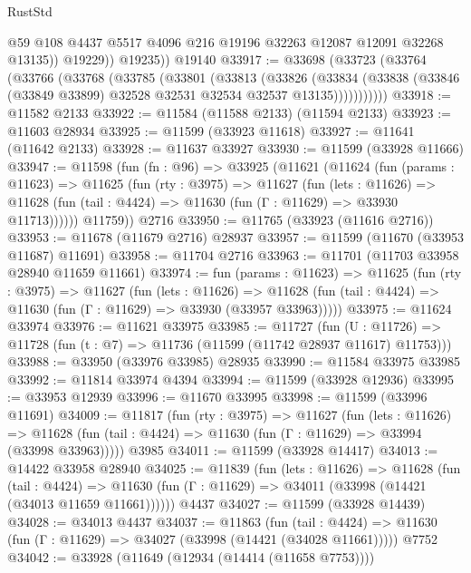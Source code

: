 \begin{lexlean}{RustStd}
\begin{coremodule}
                @59
                @108
                @4437
                @5517
                @4096
                @216
                @19196
                @32263
                @12087
                @12091
                @32268
                @13135))
            @19229))
        @19235))
    @19140
@33917 := @33698
    (@33723
      (@33764
        (@33766
          (@33768
            (@33785
              (@33801
                (@33813
                  (@33826
                    (@33834
                      (@33838 (@33846 (@33849 @33899) @32528 @32531 @32534 @32537 @13135)))))))))))
@33918 := @11582 @2133
@33922 := @11584 (@11588 @2133) (@11594 @2133)
@33923 := @11603 @28934
@33925 := @11599 (@33923 @11618)
@33927 := @11641 (@11642 @2133)
@33928 := @11637 @33927
@33930 := @11599 (@33928 @11666)
@33947 := @11598
    (fun (fn : @96) =>
    @33925
      (@11621
        (@11624
          (fun (params : @11623) =>
          @11625
            (fun (rty : @3975) =>
            @11627
              (fun (lets : @11626) =>
              @11628 (fun (tail : @4424) => @11630 (fun (Γ : @11629) => @33930 @11713))))))
        @11759))
    @2716
@33950 := @11765 (@33923 (@11616 @2716))
@33953 := @11678 (@11679 @2716) @28937
@33957 := @11599 (@11670 (@33953 @11687) @11691)
@33958 := @11704 @2716
@33963 := @11701 (@11703 @33958 @28940 @11659 @11661)
@33974 := fun (params : @11623) =>
  @11625
    (fun (rty : @3975) =>
    @11627
      (fun (lets : @11626) =>
      @11628 (fun (tail : @4424) => @11630 (fun (Γ : @11629) => @33930 (@33957 @33963)))))
@33975 := @11624 @33974
@33976 := @11621 @33975
@33985 := @11727
    (fun (U : @11726) => @11728 (fun (t : @7) => @11736 (@11599 (@11742 @28937 @11617) @11753)))
@33988 := @33950 (@33976 @33985) @28935
@33990 := @11584 @33975 @33985
@33992 := @11814 @33974 @4394
@33994 := @11599 (@33928 @12936)
@33995 := @33953 @12939
@33996 := @11670 @33995
@33998 := @11599 (@33996 @11691)
@34009 := @11817
    (fun (rty : @3975) =>
    @11627
      (fun (lets : @11626) =>
      @11628 (fun (tail : @4424) => @11630 (fun (Γ : @11629) => @33994 (@33998 @33963)))))
    @3985
@34011 := @11599 (@33928 @14417)
@34013 := @14422 @33958 @28940
@34025 := @11839
    (fun (lets : @11626) =>
    @11628
      (fun (tail : @4424) =>
      @11630 (fun (Γ : @11629) => @34011 (@33998 (@14421 (@34013 @11659 @11661))))))
    @4437
@34027 := @11599 (@33928 @14439)
@34028 := @34013 @4437
@34037 := @11863
    (fun (tail : @4424) => @11630 (fun (Γ : @11629) => @34027 (@33998 (@14421 (@34028 @11661)))))
    @7752
@34042 := @33928 (@11649 (@12934 (@14414 (@11658 @7753))))

\end{coremodule}
\end{lexlean}
